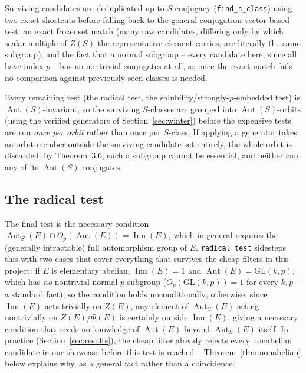 \documentclass[11pt]{article}
\theoremstyle{remark}
\begin{document}
Surviving candidates are deduplicated up to $S$-conjugacy
(\texttt{find\_s\_class}) using two exact shortcuts before falling back to
the general conjugation-vector-based test: an exact frozenset match (many
raw candidates, differing only by which scalar multiple of $Z(S)$ the
representative element carries, are literally the same subgroup), and the
fact that a normal subgroup -- every candidate here, since all have index
$p$ -- has no nontrivial conjugates at all, so once the exact match fails no
comparison against previously-seen classes is needed.

Every remaining test (the radical test, the solubility/strongly-$p$-embedded
test) is $\operatorname{Aut}(S)$-invariant, so the surviving $S$-classes are
grouped into $\operatorname{Aut}(S)$-orbits (using the verified generators
of Section~\ref{sec:winter}) before the expensive tests are run \emph{once
per orbit} rather than once per $S$-class. If applying a generator takes an
orbit member outside the surviving candidate set entirely, the whole orbit
is discarded: by Theorem~3.6, such a subgroup cannot be essential, and
neither can any of its $\operatorname{Aut}(S)$-conjugates.

\subsection{The radical test}

The final test is the necessary condition
$\operatorname{Aut}_S(E) \cap O_p(\operatorname{Aut}(E)) =
\operatorname{Inn}(E)$, which in general requires the (generally
intractable) full automorphism group of $E$. \texttt{radical\_test}
sidesteps this with two cases that cover everything that survives the
cheap filters in this project: if $E$ is elementary abelian,
$\operatorname{Inn}(E)=1$ and $\operatorname{Aut}(E) = \mathrm{GL}(k,p)$,
which has \emph{no} nontrivial normal $p$-subgroup
($O_p(\mathrm{GL}(k,p))=1$ for every $k,p$ -- a standard fact), so the
condition holds unconditionally; otherwise, since
$\operatorname{Inn}(E)$ acts trivially on $Z(E)$, any element of
$\operatorname{Aut}_S(E)$ acting nontrivially on $Z(E)/\Phi(E)$ is
certainly outside $\operatorname{Inn}(E)$, giving a necessary condition
that needs no knowledge of $\operatorname{Aut}(E)$ beyond
$\operatorname{Aut}_S(E)$ itself. In practice (Section~\ref{sec:results}),
the cheap filter already rejects every nonabelian candidate in our showcase
before this test is reached -- Theorem~\ref{thm:nonabelian} below explains
why, as a general fact rather than a coincidence.
\end{document}
